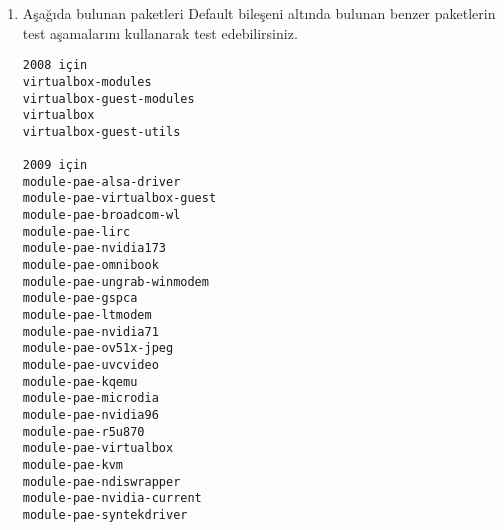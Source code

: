 \documentclass[a4paper,10pt]{article}
\begin{document}
\begin{enumerate}
\item Aşağıda bulunan paketleri Default bileşeni altında bulunan benzer paketlerin test aşamalarını kullanarak test edebilirsiniz.

\begin{verbatim}
2008 için
virtualbox-modules
virtualbox-guest-modules
virtualbox
virtualbox-guest-utils

2009 için
module-pae-alsa-driver
module-pae-virtualbox-guest
module-pae-broadcom-wl
module-pae-lirc
module-pae-nvidia173
module-pae-omnibook
module-pae-ungrab-winmodem
module-pae-gspca
module-pae-ltmodem
module-pae-nvidia71
module-pae-ov51x-jpeg
module-pae-uvcvideo
module-pae-kqemu
module-pae-microdia
module-pae-nvidia96
module-pae-r5u870
module-pae-virtualbox
module-pae-kvm
module-pae-ndiswrapper
module-pae-nvidia-current
module-pae-syntekdriver   
\end{verbatim}
\end{enumerate}
\end{document}
